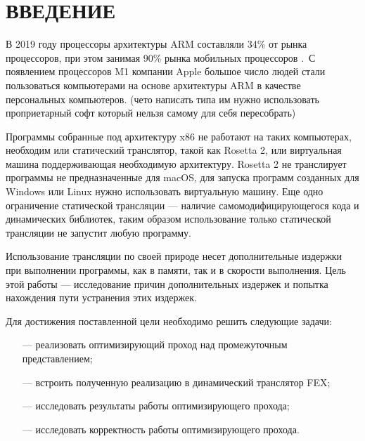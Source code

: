 \section*{ВВЕДЕНИЕ}

В 2019 году процессоры архитектуры ARM составляли 34\% от рынка процессоров, при этом занимая 90\% рынка мобильных процессоров \cite{arm_report}. С появлением процессоров M1 компании Apple большое число людей стали пользоваться компьютерами на основе архитектуры ARM в качестве персональных компьютеров. (чето написать типа им нужно использовать проприетарный софт который нельзя самому для себя пересобрать)

Программы собранные под архитектуру x86 не работают на таких компьютерах, необходим или статический транслятор, такой как Rosetta 2, или виртуальная машина поддерживающая необходимую архитектуру. Rosetta 2 не транслирует программы не предназначенные для macOS, для запуска программ созданных для Windows или Linux нужно использовать виртуальную машину. Еще одно ограничение статической трансляции --- наличие самомодифицирующегося кода и динамических библиотек, таким образом использование только статической трансляции не запустит любую программу. \cite{fast_bin}

Использование трансляции по своей природе несет дополнительные издержки при выполнении программы, как в памяти, так и в скорости выполнения. Цель этой работы --- исследование причин дополнительных издержек и попытка нахождения пути устранения этих издержек.

Для достижения поставленной цели необходимо решить следующие задачи:

\begin{itemize}[leftmargin=1.6\parindent]
	\item [---] реализовать оптимизирующий проход над промежуточным представлением;
	\item [---] встроить полученную реализацию в динамический транслятор FEX;
	\item [---] исследовать результаты работы оптимизирующего прохода;
	\item [---] исследовать корректность работы оптимизирующего прохода.
\end{itemize}
\pagebreak